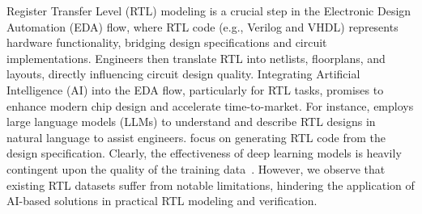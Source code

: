 Register Transfer Level (RTL) modeling is a crucial step in the Electronic Design Automation (EDA) flow, where RTL code (e.g., Verilog and VHDL) represents hardware functionality, bridging design specifications and circuit implementations. Engineers then translate RTL into netlists, floorplans, and layouts, directly influencing circuit design quality.
Integrating Artificial Intelligence (AI) into the EDA flow, particularly for RTL tasks, promises to enhance modern chip design and accelerate time-to-market. 
For instance,\cite{allam2024RTL-Repo} employs large language models (LLMs) to understand and describe RTL designs in natural language to assist engineers.\cite{cui2024OriGen,thakur2023benchmarking} focus on generating RTL code from the design specification. Clearly, the effectiveness of deep learning models is heavily contingent upon the quality of the training data~\cite{chang2024dataisall}. However, we observe that existing RTL datasets suffer from notable limitations, hindering the application of AI-based solutions in practical RTL modeling and verification.




